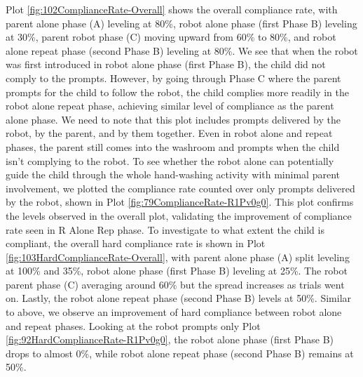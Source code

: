 Plot \ref{fig:102ComplianceRate-Overall} shows the overall compliance rate, with parent alone phase (A) leveling at 80\%, robot alone phase (first Phase B) leveling at 30\%, parent robot phase (C) moving upward from 60\% to 80\%, and robot alone repeat phase (second Phase B) leveling at 80\%.  We see that when the robot was first introduced in robot alone phase (first Phase B), the child did not comply to the prompts.  However, by going through Phase C where the parent prompts for the child to follow the robot, the child complies more readily in the robot alone repeat phase, achieving similar level of compliance as the parent alone phase.  We need to note that this plot includes prompts delivered by the robot, by the parent, and by them together.  Even in robot alone and repeat phases, the parent still comes into the washroom and prompts when the child isn't complying to the robot.  To see whether the robot alone can potentially guide the child through the whole hand-washing activity with minimal parent involvement, we plotted the compliance rate counted over only prompts delivered by the robot, shown in Plot \ref{fig:79ComplianceRate-R1Pv0g0}.  This plot confirms the levels observed in the overall plot, validating the improvement of compliance rate seen in R Alone Rep phase.  To investigate to what extent the child is compliant, the overall hard compliance rate is shown in Plot \ref{fig:103HardComplianceRate-Overall}, with parent alone phase (A) split leveling at 100\% and 35\%, robot alone phase (first Phase B) leveling at 25\%.  The robot parent phase (C) averaging around 60\% but the spread increases as trials went on.  Lastly, the robot alone repeat phase (second Phase B) levels at 50\%.  Similar to above, we observe an improvement of hard compliance between robot alone and repeat phases.  Looking at the robot prompts only Plot \ref{fig:92HardComplianceRate-R1Pv0g0}, the robot alone phase (first Phase B) drops to almost 0\%, while robot alone repeat phase (second Phase B) remains at 50\%.
